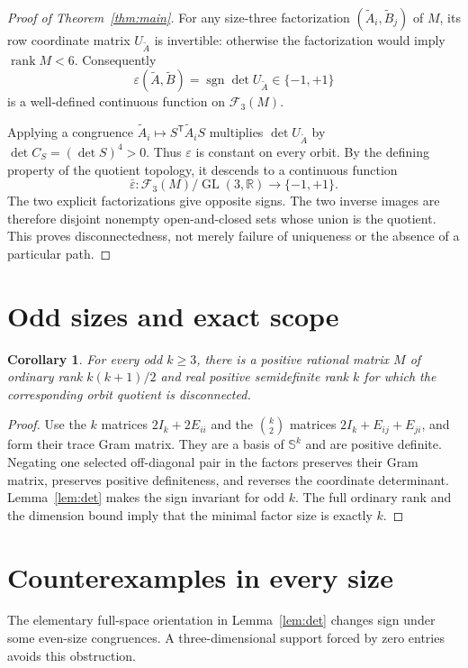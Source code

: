 \documentclass[11pt]{article}
\newtheorem{corollary}[theorem]{Corollary}
\newcommand{\GL}{\operatorname{GL}}
\newcommand{\rank}{\operatorname{rank}}
\begin{document}
\begin{proof}[Proof of Theorem~\ref{thm:main}]
For any size-three factorization $(\widetilde A_i,\widetilde B_j)$ of $M$, its row coordinate matrix $U_{\widetilde A}$ is invertible: otherwise the factorization would imply $\rank M<6$. Consequently
\[
 \varepsilon(\widetilde A,\widetilde B)
 =\operatorname{sgn}\det U_{\widetilde A}\in\{-1,+1\}
\]
is a well-defined continuous function on $\mathcal F_3(M)$.

Applying a congruence $\widetilde A_i\mapsto S^{\mathsf T}\widetilde A_iS$ multiplies $\det U_{\widetilde A}$ by $\det C_S=(\det S)^4>0$. Thus $\varepsilon$ is constant on every orbit. By the defining property of the quotient topology, it descends to a continuous function
\[
 \bar\varepsilon:\mathcal F_3(M)/\GL(3,\mathbb R)\longrightarrow\{-1,+1\}.
\]
The two explicit factorizations give opposite signs. The two inverse images are therefore disjoint nonempty open-and-closed sets whose union is the quotient. This proves disconnectedness, not merely failure of uniqueness or the absence of a particular path.
\end{proof}

\section{Odd sizes and exact scope}
\begin{corollary}
For every odd $k\geq3$, there is a positive rational matrix $M$ of ordinary rank $k(k+1)/2$ and real positive semidefinite rank $k$ for which the corresponding orbit quotient is disconnected.
\end{corollary}
\begin{proof}
Use the $k$ matrices $2I_k+2E_{ii}$ and the $\binom{k}{2}$ matrices $2I_k+E_{ij}+E_{ji}$, and form their trace Gram matrix. They are a basis of $\mathbb S^k$ and are positive definite. Negating one selected off-diagonal pair in the factors preserves their Gram matrix, preserves positive definiteness, and reverses the coordinate determinant. Lemma~\ref{lem:det} makes the sign invariant for odd $k$. The full ordinary rank and the dimension bound imply that the minimal factor size is exactly $k$.
\end{proof}

\section{Counterexamples in every size}
The elementary full-space orientation in Lemma~\ref{lem:det} changes sign under some even-size congruences. A three-dimensional support forced by zero entries avoids this obstruction.
\end{document}
